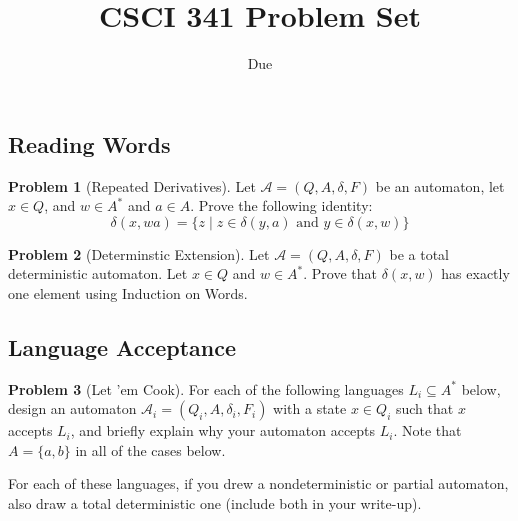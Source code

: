 \documentclass[11pt]{article}
\title{CSCI 341 Problem Set \pset}
\author{\subtitle}
\date{Due
    \duedate
}
\theoremstyle{theorem} %
\theoremstyle{definition} %
\newtheorem{problem}                    {{\color{BurntOrange}Problem}}
\theoremstyle{remark} %
\begin{document}
\maketitle

\subsection*{Reading Words}

\begin{problem}
    [Repeated Derivatives]
    Let \(\mathcal A = (Q, A, \delta, F)\) be an automaton, let \(x \in Q\), and \(w \in A^*\) and \(a \in A\).
    Prove the following identity:
    \[
        \delta(x, w a) = \{z \mid z \in \delta(y, a) \text{ and } y \in \delta(x, w)\}
    \]
\end{problem}

\begin{problem}
    [Determinstic Extension]
    Let \(\mathcal A = (Q, A, \delta, F)\) be a total deterministic automaton.
    Let \(x \in Q\) and \(w \in A^*\).
    Prove that \(\delta(x, w)\) has exactly one element using Induction on Words.
\end{problem}

\subsection*{Language Acceptance}

\begin{problem}
    [Let 'em Cook]
    For each of the following languages \(L_i \subseteq A^*\) below, design an automaton \(\mathcal A_i = (Q_i, A, \delta_i, F_i)\) with a state \(x \in Q_i\) such that \(x\) accepts \(L_i\), and briefly explain why your automaton accepts \(L_i\).
    Note that \(A = \{a, b\}\) in all of the cases below.
    For each of these languages, if you drew a nondeterministic or partial automaton, also draw a total deterministic one (include both in your write-up).
\end{problem}
\end{document}
